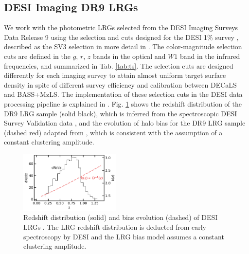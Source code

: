 \subsection{DESI Imaging DR9 LRGs}
We work with the photometric LRGs selected from the DESI Imaging Surveys Data Release 9 \citep[DR9;][]{dey2018overview} using the selection and cuts designed for the DESI 1\% survey , described as the SV3 selection in more detail in \cite{zhou2022target}. The color-magnitude selection cuts are defined in the $g$, $r$, $z$ bands in the optical and $W1$ band in the infrared frequencies, and summarized in Tab. \ref{tab:ts}. The selection cuts are designed differently for each imaging survey to attain almost uniform target surface density in spite of different survey efficiency and calibration between DECaLS and BASS+MzLS. The implementation of these selection cuts in the DESI data processing pipeline is explained in \cite{myers2022}. Fig. \ref{fig:nz} shows the redshift distribution of the DR9 LRG sample (solid black), which is inferred from the spectroscopic DESI Survey Validation data , and the evolution of halo bias for the DR9 LRG sample (dashed red) adapted from \cite{zhou2021clustering}, which is consistent with the assumption of a constant clustering amplitude. 

\begin{figure}
    \centering
    \includegraphics[width=0.45\textwidth]{figures/nz_lrg.pdf}
    \caption{Redshift distribution (solid) and bias evolution (dashed) of DESI LRGs \citep{zhou2021clustering, zhou2022target}. The LRG redshift distribution is deducted from early spectroscopy by DESI and the LRG bias model assumes a constant clustering amplitude.}
    \label{fig:nz}
\end{figure}

